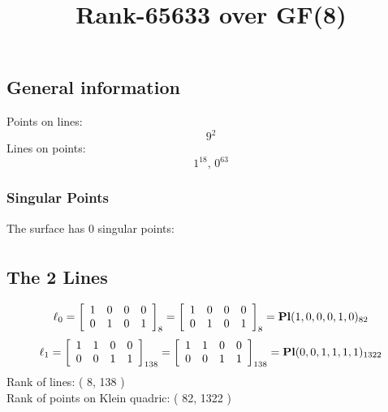 \documentclass{article}
\newcommand\setTBstruts{\def\T{\rule{0pt}{2.6ex}}%
\def\B{\rule[-1.2ex]{0pt}{0pt}}}
\begin{document}
 
\setTBstruts



{\allowdisplaybreaks%






\title{Rank-65633 over GF(8)}
\author{}%
\maketitle%
%
{}



\subsection*{General information}
Points on lines:
$$
9^2$$
Lines on points:
$$
1^{18},\,0^{63}$$
\subsubsection*{Singular Points}
The surface has 0 singular points:\\
\begin{align*}
\end{align*}
\subsection*{The 2 Lines}
$$
\ell_{0} = 
\left[
\begin{array}{*{4}{r}}
1 & 0 & 0 & 0\\
0 & 1 & 0 & 1\\
\end{array}
\right]
_{8}
=
\left[
\begin{array}{*{4}c}
1  & 0  & 0  & 0\\
0  & 1  & 0  & 1\\
\end{array}
\right]_{8}
={\rm\bf Pl}(1,0,0,0,1,0 )_{82}$$
$$
\ell_{1} = 
\left[
\begin{array}{*{4}{r}}
1 & 1 & 0 & 0\\
0 & 0 & 1 & 1\\
\end{array}
\right]
_{138}
=
\left[
\begin{array}{*{4}c}
1  & 1  & 0  & 0\\
0  & 0  & 1  & 1\\
\end{array}
\right]_{138}
={\rm\bf Pl}(0,0,1,1,1,1 )_{1322}$$
Rank of lines: ( 8, 138 )\\
Rank of points on Klein quadric: ( 82, 1322 )\\
}
\end{document}
